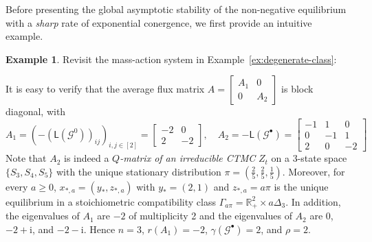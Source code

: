 \documentclass[10pt]{amsart}
\numberwithin{equation}{section}
\theoremstyle{plain}
\theoremstyle{definition}
\newtheorem{example}[theorem]{Example}
\theoremstyle{remark}
\newcommand{\cG}{\mathcal{G}}
\begin{document}
Before presenting the global asymptotic stability of the non-negative equilibrium with a \emph{sharp} rate of exponential conergence, we first provide an intuitive example.
\begin{example}\label{ex:rate-convergence}
Revisit the mass-action system in Example~\ref{ex:degenerate-class}: 
\begin{center}
\end{center}
It is easy to verify that the average flux matrix $A=\begin{bmatrix}A_1&0\\
0&A_2\end{bmatrix}$ is block diagonal, with $$A_1=(-(\mathsf{L}(\cG^0))_{ij})_{i,j\in[2]}=\begin{bmatrix}-2&0\\
2&-2\end{bmatrix},\quad A_2=-\mathsf{L}(\cG^{\bullet})=\begin{bmatrix}-1&1&0\\
0&-1&1\\
2&0&-2\end{bmatrix}$$ Note that $A_2$ is indeed a 
\emph{$Q$-matrix of an irreducible CTMC}  $Z_t$ on a 3-state space $\{S_3,S_4,S_5\}$ with the unique stationary distribution $\pi=(\tfrac{2}{5},\tfrac{2}{5},\tfrac{1}{5})$. Moreover, for every $a\ge0$,  $x_{*,a}=(y_*,z_{*,a})$ with $y_{*}=(2,1)$ and 
$z_{*,a}=a\pi$ is the unique equilibrium in a stoichiometric compatibility class $\Gamma_{a\pi}=\mathbb{R}^2_+\times a\Delta_3$. In addition,  the eigenvalues of $A_1$ are $-2$ of multiplicity 2 and the eigenvalues of $A_2$ are $0$, $-2+\textrm{i}$, and $-2-\textrm{i}$. Hence $n=3$, $r(A_1)=-2$, $\gamma(\cG^{\bullet})=2$, and $\rho=2$.


\end{example}
\end{document}

